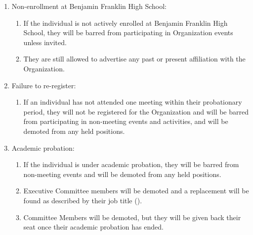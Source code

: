 \begin{enumerate}
	\item Non-enrollment at Benjamin Franklin High School:
		\begin{enumerate}
			\item If the individual is not actively enrolled at Benjamin Franklin High
				School, they will be barred from participating in Organization events
				unless invited.

			\item They are still allowed to advertise any past or present affiliation with
				the Organization.
		\end{enumerate}

	\item Failure to re-register:
		\begin{enumerate}
			\item If an individual has not attended one meeting within their probationary
				period, they will not be registered for the Organization and will be
				barred from participating in non-meeting events and activities, and will
				be demoted from any held positions.
		\end{enumerate}

	\item Academic probation:
		\begin{enumerate}
			\item If the individual is under academic probation, they will be barred
				from non-meeting events and will be demoted from any held positions.

			\item Executive Committee members will be demoted and a replacement will be found
				as described by their job title ().

			\item Committee Members will be demoted, but they will be given back their
				seat once their academic probation has ended.
		\end{enumerate}
\end{enumerate}

